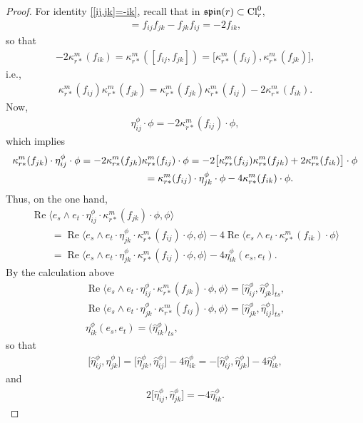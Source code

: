 \documentclass[pdftex]{sigma}
\numberwithin{equation}{section}
\begin{document}
\begin{proof}
For identity \eqref{[ij,jk]=-ik}, recall that in $\mathfrak{spin}(r)\subset {\rm Cl}_r^0$,
\begin{gather*}
[f_{ij},f_{jk}] = f_{ij}f_{jk}-f_{jk}f_{ij}= -2f_{ik},
\end{gather*}
so that
\begin{gather*}
 -2\kappa_{r*}^m(f_{ik}) =\kappa_{r*}^m([f_{ij},f_{jk}])= \big[\kappa_{r*}^m(f_{ij}),\kappa_{r*}^m(f_{jk})\big],
\end{gather*}
i.e.,
\begin{gather*}\kappa_{r*}^m(f_{ij})\kappa_{r*}^m(f_{jk})
=\kappa_{r*}^m(f_{jk})\kappa_{r*}^m(f_{ij})-2\kappa_{r*}^m(f_{ik}).\end{gather*}
Now,
\begin{gather*}\eta_{ij}^\phi\cdot\phi = -2 \kappa_{r*}^m(f_{ij})\cdot \phi,\end{gather*}
which implies
\begin{gather*}
\kappa_{r*}^m(f_{jk})\cdot\eta_{ij}^\phi\cdot \phi = -2 \kappa_{r*}^m(f_{jk})\kappa_{r*}^m(f_{ij})\cdot
\phi= -2 \big[\kappa_{r*}^m(f_{ij})\kappa_{r*}^m(f_{jk})+2\kappa_{r*}^m(f_{ik})\big]\cdot \phi\\
\hphantom{\kappa_{r*}^m(f_{jk})\cdot\eta_{ij}^\phi\cdot \phi}{}
= \kappa_{r*}^m(f_{ij})\cdot\eta_{jk}^\phi\cdot \phi - 4 \kappa_{r*}^m(f_{ik})\cdot \phi.
\end{gather*}
Thus, on the one hand,
\begin{gather*}
\operatorname{Re}\big\langle e_s\wedge e_t \cdot \eta_{ij}^\phi\cdot \kappa_{r*}^m(f_{jk})\cdot\phi,\phi\big\rangle\\
\qquad{} = \operatorname{Re}\big\langle e_s\wedge e_t \cdot \eta_{jk}^\phi\cdot
\kappa_{r*}^m(f_{ij})\cdot\phi,\phi\big\rangle - 4\operatorname{Re}\big\langle e_s\wedge e_t\cdot
\kappa_{r*}^m(f_{ik})\cdot\phi \big\rangle \\
 \qquad = \operatorname{Re}\big\langle e_s\wedge e_t \cdot \eta_{jk}^\phi\cdot
\kappa_{r*}^m(f_{ij})\cdot\phi,\phi\big\rangle - 4 \eta_{ik}^\phi(e_s,e_t).
\end{gather*}
By the calculation above
\begin{gather*}
\operatorname{Re}\big\langle e_s\wedge e_t \cdot \eta_{ij}^\phi\cdot \kappa_{r*}^m(f_{jk})\cdot\phi,\phi\big\rangle
 = \big[\hat\eta_{ij}^\phi,\hat\eta_{jk}^\phi\big]_{ts},\\
\operatorname{Re}\big\langle e_s\wedge e_t \cdot \eta_{jk}^\phi\cdot \kappa_{r*}^m(f_{ij})\cdot\phi,\phi\big\rangle= \big[\hat\eta_{jk}^\phi,\hat\eta_{ij}^\phi\big]_{ts},\\
\eta_{ik}^\phi(e_s,e_t) = \big(\hat\eta_{ik}^\phi\big)_{ts},
\end{gather*}
so that
\begin{gather*}
\big[\hat\eta_{ij}^\phi,\hat\eta_{jk}^\phi \big] =\big[\hat\eta_{jk}^\phi,\hat\eta_{ij}^\phi\big] - 4\hat\eta_{ik}^\phi
 = - \big[\hat\eta_{ij}^\phi,\hat\eta_{jk}^\phi \big] - 4\hat\eta_{ik}^\phi,
\end{gather*}
and
\begin{gather*}
2 \big[\hat\eta_{ij}^\phi,\hat\eta_{jk}^\phi\big] = -4\hat\eta_{ik}^\phi.\tag*{\qed}
\end{gather*}\renewcommand{\qed}{}
\end{proof}
\end{document}
